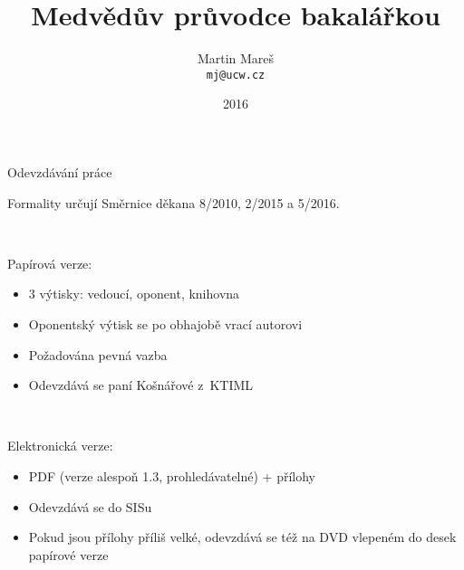 \documentclass{beamer}
\title[Medvědův průvodce bakalářkou]{Medvědův průvodce bakalářkou}
\author[Martin Mareš]{Martin Mareš\\\texttt{mj@ucw.cz}}
\institute{Katedra Aplikované Matematiky\\MFF UK Praha}
\date{2016}
\begin{document}

\begin{frame}
\titlepage
\end{frame}

\begin{frame}{Odevzdávání práce}

Formality určují Směrnice děkana 8/2010, 2/2015 a 5/2016.

~

Papírová verze:

\begin{itemize}
\item 3 výtisky: vedoucí, oponent, knihovna
\item Oponentský výtisk se po obhajobě vrací autorovi
\item Požadována pevná vazba
\item Odevzdává se paní Košnářové z~KTIML
\end{itemize}

~

Elektronická verze:

\begin{itemize}
\item PDF (verze alespoň 1.3, prohledávatelné) + přílohy
\item Odevzdává se do SISu
\item Pokud jsou přílohy příliš velké, odevzdává se též
      na DVD vlepeném do desek papírové verze
\end{itemize}

\end{frame}
\end{document}

